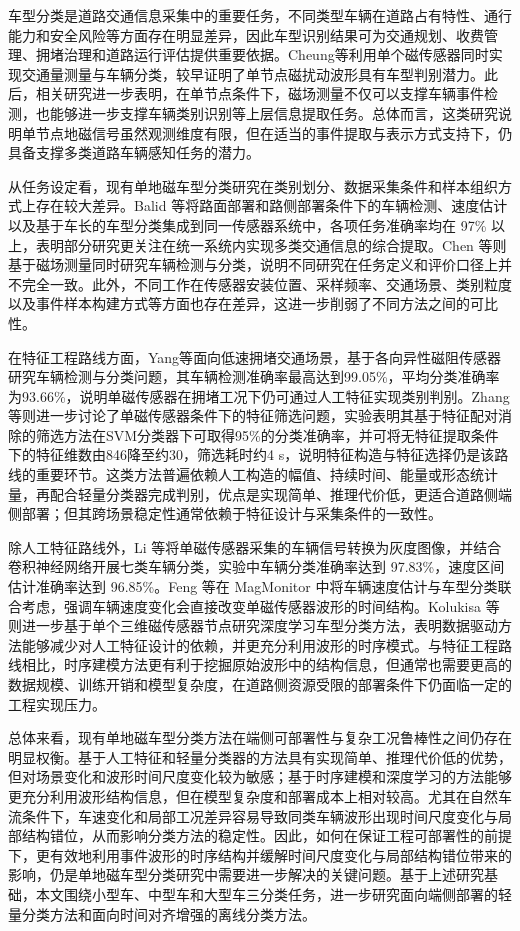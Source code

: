 \documentclass{xdupgthesis}
\begin{document}
车型分类是道路交通信息采集中的重要任务，不同类型车辆在道路占有特性、通行能力和安全风险等方面存在明显差异，因此车型识别结果可为交通规划、收费管理、拥堵治理和道路运行评估提供重要依据。Cheung等\cite{R17}利用单个磁传感器同时实现交通量测量与车辆分类，较早证明了单节点磁扰动波形具有车型判别潜力。此后，相关研究进一步表明，在单节点条件下，磁场测量不仅可以支撑车辆事件检测，也能够进一步支撑车辆类别识别等上层信息提取任务\cite{R19}。总体而言，这类研究说明单节点地磁信号虽然观测维度有限，但在适当的事件提取与表示方式支持下，仍具备支撑多类道路车辆感知任务的潜力。

从任务设定看，现有单地磁车型分类研究在类别划分、数据采集条件和样本组织方式上存在较大差异。Balid 等\cite{R18}将路面部署和路侧部署条件下的车辆检测、速度估计以及基于车长的车型分类集成到同一传感器系统中，各项任务准确率均在 97\% 以上，表明部分研究更关注在统一系统内实现多类交通信息的综合提取。Chen 等\cite{R19}则基于磁场测量同时研究车辆检测与分类，说明不同研究在任务定义和评价口径上并不完全一致。此外，不同工作在传感器安装位置、采样频率、交通场景、类别粒度以及事件样本构建方式等方面也存在差异，这进一步削弱了不同方法之间的可比性。

在特征工程路线方面，Yang等\cite{R20}面向低速拥堵交通场景，基于各向异性磁阻传感器研究车辆检测与分类问题，其车辆检测准确率最高达到99.05\%，平均分类准确率为93.66\%，说明单磁传感器在拥堵工况下仍可通过人工特征实现类别判别。Zhang等\cite{ch3_zhang2019featureselection}则进一步讨论了单磁传感器条件下的特征筛选问题，实验表明其基于特征配对消除的筛选方法在SVM分类器下可取得95\%的分类准确率，并可将无特征提取条件下的特征维数由846降至约30，筛选耗时约4 s，说明特征构造与特征选择仍是该路线的重要环节。这类方法普遍依赖人工构造的幅值、持续时间、能量或形态统计量，再配合轻量分类器完成判别，优点是实现简单、推理代价低，更适合道路侧端侧部署；但其跨场景稳定性通常依赖于特征设计与采集条件的一致性。

除人工特征路线外，Li 等\cite{ch3_li2020singlemag}将单磁传感器采集的车辆信号转换为灰度图像，并结合卷积神经网络开展七类车辆分类，实验中车辆分类准确率达到 97.83\%，速度区间估计准确率达到 96.85\%。Feng 等\cite{feng2022magmonitor}在 MagMonitor 中将车辆速度估计与车型分类联合考虑，强调车辆速度变化会直接改变单磁传感器波形的时间结构。Kolukisa 等\cite{R26}则进一步基于单个三维磁传感器节点研究深度学习车型分类方法，表明数据驱动方法能够减少对人工特征设计的依赖，并更充分利用波形的时序模式。与特征工程路线相比，时序建模方法更有利于挖掘原始波形中的结构信息，但通常也需要更高的数据规模、训练开销和模型复杂度，在道路侧资源受限的部署条件下仍面临一定的工程实现压力。

总体来看，现有单地磁车型分类方法在端侧可部署性与复杂工况鲁棒性之间仍存在明显权衡。基于人工特征和轻量分类器的方法具有实现简单、推理代价低的优势，但对场景变化和波形时间尺度变化较为敏感；基于时序建模和深度学习的方法能够更充分利用波形结构信息，但在模型复杂度和部署成本上相对较高。尤其在自然车流条件下，车速变化和局部工况差异容易导致同类车辆波形出现时间尺度变化与局部结构错位，从而影响分类方法的稳定性。因此，如何在保证工程可部署性的前提下，更有效地利用事件波形的时序结构并缓解时间尺度变化与局部结构错位带来的影响，仍是单地磁车型分类研究中需要进一步解决的关键问题。基于上述研究基础，本文围绕小型车、中型车和大型车三分类任务，进一步研究面向端侧部署的轻量分类方法和面向时间对齐增强的离线分类方法。
\end{document}
